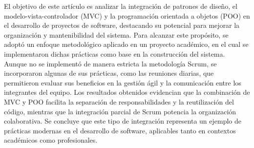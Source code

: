 El objetivo de este artículo es analizar la integración de patrones de diseño, el modelo-vista-controlador (MVC) y la programación orientada a objetos (POO) en el desarrollo de proyectos de software, destacando su potencial para mejorar la organización y mantenibilidad del sistema. Para alcanzar este propósito, se adoptó un enfoque metodológico aplicado en un proyecto académico, en el cual se implementaron dichas prácticas como base en la construcción del sistema. Aunque no se implementó de manera estricta la metodología Scrum, se incorporaron algunas de sus prácticas, como las reuniones diarias, que permitieron evaluar sus beneficios en la gestión ágil y la comunicación entre los integrantes del equipo. Los resultados obtenidos evidencian que la combinación de MVC y POO facilita la separación de responsabilidades y la reutilización del código, mientras que la integración parcial de Scrum potencia la organización colaborativa. Se concluye que este tipo de integración representa un ejemplo de prácticas modernas en el desarrollo de software, aplicables tanto en contextos académicos como profesionales.

